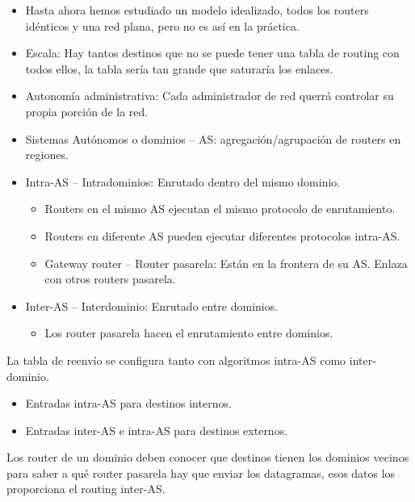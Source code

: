 \documentclass[12pt, twoside, openright]{report} %
\begin{document}
\begin{itemize}
	\item Hasta ahora hemos estudiado un modelo idealizado, todos los
	      routers idénticos y una red plana, pero no es así en la práctica.
	\item Escala: Hay tantos destinos que no se puede tener una tabla de
	      routing con todos ellos, la tabla sería tan grande que saturaría
	      los enlaces.
	\item Autonomía administrativa: Cada administrador de red querrá
	      controlar su propia porción de la red.
	\item Sistemas Autónomos o dominios -- AS: agregación/agrupación de
	      routers en regiones.
	\item Intra-AS -- Intradominios: Enrutado dentro del mismo dominio.

	      \begin{itemize}
		      \item Routers en el mismo AS ejecutan el mismo protocolo de
		            enrutamiento.
		      \item Routers en diferente AS pueden ejecutar diferentes protocolos
		            intra-AS.
		      \item Gateway router -- Router pasarela: Están en la frontera de su
		            AS. Enlaza con otros routers pasarela.
	      \end{itemize}
	\item Inter-AS -- Interdominio: Enrutado entre dominios.

	      \begin{itemize}
		      \item Los router pasarela hacen el enrutamiento entre dominios.
	      \end{itemize}
\end{itemize}

La tabla de reenvío se configura tanto con algoritmos intra-AS como
inter-dominio.

\begin{itemize}
	\item Entradas intra-AS para destinos internos.
	\item Entradas inter-AS e intra-AS para destinos externos.
\end{itemize}

Los router de un dominio deben conocer que destinos tienen los
dominios vecinos para saber a qué router pasarela hay que enviar los
datagramas, esos datos los proporciona el routing inter-AS.
\end{document}

